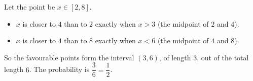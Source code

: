 Let the point be $x\in[2,8]$.
\begin{itemize}
\item $x$ is closer to $4$ than to $2$ exactly when $x>3$ (the midpoint of $2$ and $4$).
\item $x$ is closer to $4$ than to $8$ exactly when $x<6$ (the midpoint of $4$ and $8$).
\end{itemize}
So the favourable points form the interval $(3,6)$, of length $3$, out of the total length $6$. The probability is $\dfrac{3}{6}=\boxed{\dfrac{1}{2}}$.
